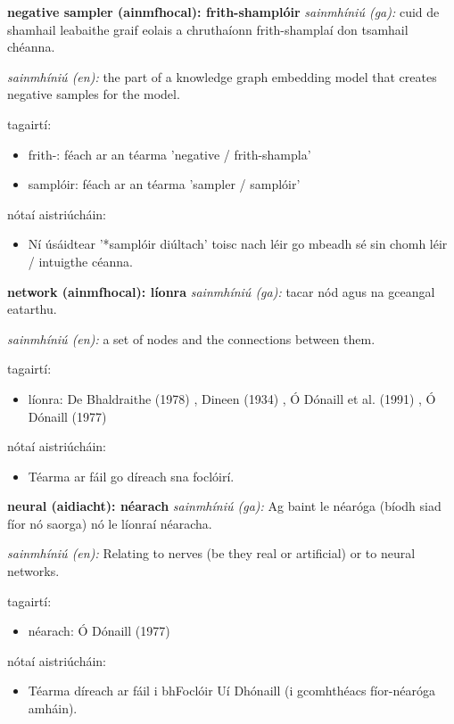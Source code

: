 \documentclass{article}
\begin{document}
\textbf{negative sampler (ainmfhocal): frith-shamplóir}
\textit{sainmhíniú (ga):} cuid de shamhail leabaithe graif eolais a chruthaíonn frith-shamplaí don tsamhail chéanna.

\textit{sainmhíniú (en):} the part of a knowledge graph embedding model that creates negative samples for the model.

tagairtí:
\begin{itemize}
	\item frith-: féach ar an téarma 'negative / frith-shampla'
	\item samplóir: féach ar an téarma 'sampler / samplóir'
\end{itemize}

nótaí aistriúcháin:
\begin{itemize}
	\item Ní úsáidtear '*samplóir diúltach' toisc nach léir go mbeadh sé sin chomh léir / intuigthe céanna.
\end{itemize}


\textbf{network (ainmfhocal): líonra}
\textit{sainmhíniú (ga):} tacar nód agus na gceangal eatarthu.

\textit{sainmhíniú (en):} a set of nodes and the connections between them.

tagairtí:
\begin{itemize}
	\item líonra: De Bhaldraithe (1978) \cite{de-bhaldraithe}, Dineen (1934) \cite{dineen}, Ó Dónaill et al. (1991) \cite{focloir-beag}, Ó Dónaill (1977) \cite{odonaill}
\end{itemize}

nótaí aistriúcháin:
\begin{itemize}
	\item Téarma ar fáil go díreach sna foclóirí.
\end{itemize}


\textbf{neural (aidiacht): néarach}
\textit{sainmhíniú (ga):} Ag baint le néaróga (bíodh siad fíor nó saorga) nó le líonraí néaracha.

\textit{sainmhíniú (en):} Relating to nerves (be they real or artificial) or to neural networks.

tagairtí:
\begin{itemize}
	\item néarach: Ó Dónaill (1977) \cite{odonaill}
\end{itemize}

nótaí aistriúcháin:
\begin{itemize}
	\item Téarma díreach ar fáil i bhFoclóir Uí Dhónaill (i gcomhthéacs fíor-néaróga amháin).
\end{itemize}
\end{document}

